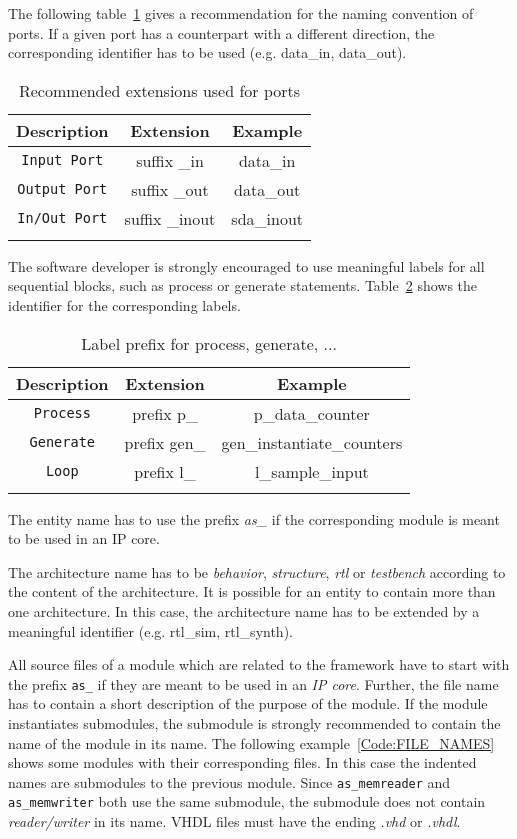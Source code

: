 The following table~\ref{Optional_Identifier} gives a recommendation for the naming convention of ports.
If a given port has a counterpart with a different direction, the corresponding identifier has to be used (e.g. data\_in, data\_out). 

\begin{longtable}[ht]{|c|c|c|}
\hline 
\textbf{Description} & \textbf{Extension} & \textbf{Example}\\
\hline
\hline
\endhead

\texttt{Input Port} & suffix \_in & data\_in \\
\hline 
\texttt{Output Port} & suffix \_out & data\_out \\
\hline 
\texttt{In/Out Port} & suffix \_inout & sda\_inout \\
\hline 
\caption{Recommended extensions used for ports}\label{Optional_Identifier}
\end{longtable}


The software developer is strongly encouraged to use meaningful labels for all sequential blocks, such as process or generate statements.
Table~\ref{Blocks} shows the identifier for the corresponding labels. 

\begin{longtable}[ht]{|c|c|c|}
\hline 
\textbf{Description} & \textbf{Extension} & \textbf{Example}\\
\hline
\hline
\endhead

\texttt{Process} & prefix p\_ & p\_data\_counter \\
\hline
\texttt{Generate} & prefix gen\_ & gen\_instantiate\_counters \\
\hline
\texttt{Loop} & prefix l\_ & l\_sample\_input \\
\hline 

\caption{Label prefix for process, generate, ...}\label{Blocks}
\end{longtable}


The entity name has to use the prefix \textit{as\_} if the corresponding module is meant to be used in an \asterics IP core. 

The architecture name has to be \textit{behavior}, \textit{structure}, \textit{rtl} or \textit{testbench} according to the content of the architecture.
It is possible for an entity to contain more than one architecture.
In this case, the architecture name has to be extended by a meaningful identifier (e.g. rtl\_sim, rtl\_synth).

All source files of a module which are related to the \asterics framework have to start with the prefix \texttt{as\_} if they are meant to be used in an \asterics \textit{IP core}.
Further, the file name has to contain a short description of the purpose of the module.
If the module instantiates submodules, the submodule is strongly recommended to contain the name of the module in its name.
The following example~\ref{Code:FILE_NAMES} shows some modules with their corresponding files.
In this case the indented names are submodules to the previous module.
Since \texttt{as\_memreader} and \texttt{as\_memwriter} both use the same submodule, the submodule does not contain \textit{reader/writer} in its name.
VHDL files must have the ending \textit{.vhd} or \textit{.vhdl}. 

